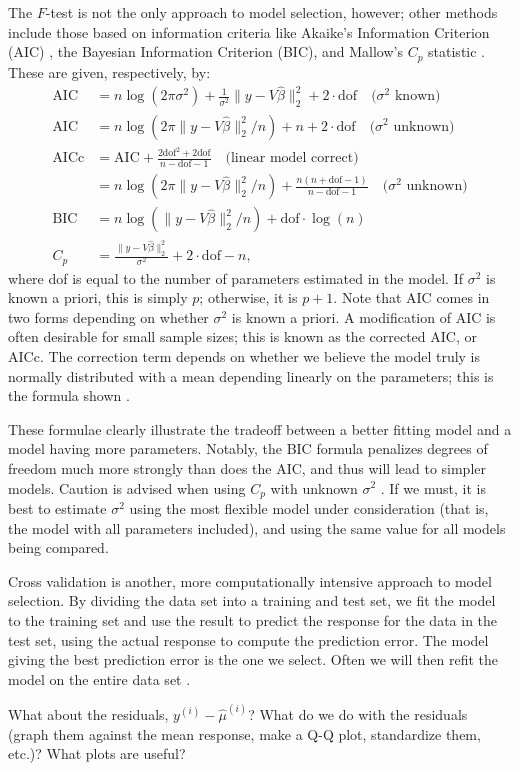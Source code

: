 \documentclass[12pt]{article}
\begin{document}
The $F$-test is not the only approach to model selection, however; other methods include those based on information criteria like Akaike's Information Criterion (AIC) \cite[\S~12.3.3]{Seber:2003}, the Bayesian Information Criterion (BIC), and Mallow's $C_p$ statistic \cite[\S~10.2.1]{Weisberg:2005}. These are given, respectively, by:
\begin{align*}
   \textrm{AIC} &= n \log (2 \pi \sigma^2) + \frac{1}{\sigma^2} \| y - V \hat{\beta} \|_2^2 + 2 \cdot \textrm{dof} \quad \textrm{($\sigma^2$ known)}\\
    \textrm{AIC} &= n \log (2 \pi \| y - V \hat{\beta} \|_2^2 / n) + n + 2 \cdot \textrm{dof} \quad \textrm{($\sigma^2$ unknown)} \\
     \textrm{AICc} &= \textrm{AIC} + \frac{2\textrm{dof}^2 + 2 \textrm{dof}}{n - \textrm{dof} - 1} \quad \textrm{(linear model correct)} \\
      &= n \log (2 \pi \| y - V \hat{\beta} \|_2^2 / n) + \frac{n(n + \textrm{dof} - 1) }{n - \textrm{dof} - 1} \quad \textrm{($\sigma^2$ unknown)} \\
   \textrm{BIC} &= n \log(\| y - V \hat{\beta} \|_2^2 / n) + \textrm{dof} \cdot \log(n) \\
   C_p &= \frac{\| y - V \hat{\beta} \|_2^2}{\sigma^2}  + 2 \cdot \textrm{dof} - n,
\end{align*}
where dof is equal to the number of parameters estimated in the model. If $\sigma^2$ is known a priori, this is simply $p$; otherwise, it is $p+1$. Note that AIC comes in two forms depending on whether $\sigma^2$ is known a priori. A modification of AIC is often desirable for small sample sizes; this is known as the corrected AIC, or AICc. The correction term depends on whether we believe the model truly is normally distributed with a mean depending linearly on the parameters; this is the formula shown \cite[\S~7.7.6]{Burnham:2002}.

These formulae clearly illustrate the tradeoff between a better fitting model and a model having more parameters. Notably, the BIC formula penalizes degrees of freedom much more strongly than does the AIC, and thus will lead to simpler models. Caution is advised when using $C_p$ with unknown $\sigma^2$ \cite[\S~1.8.6]{Wood:2017}. If we must, it is best to estimate $\sigma^2$ using the most flexible model under consideration (that is, the model with all parameters included), and using the same value for all models being compared.

Cross validation is another, more computationally intensive approach to model selection. By dividing the data set into a training and test set, we fit the model to the training set and use the result to predict the response for the data in the test set, using the actual response to compute the prediction error. The model giving the best prediction error is the one we select. Often we will then refit the model on the entire data set \cite[\S~7.10]{Hastie:2001}.

What about the residuals, $y^{(i)} - \hat{\mu}^{(i)}$? What do we do with the residuals (graph them against the mean response, make a Q-Q plot, standardize them, etc.)? What plots are useful?


\newpage

\end{document}
